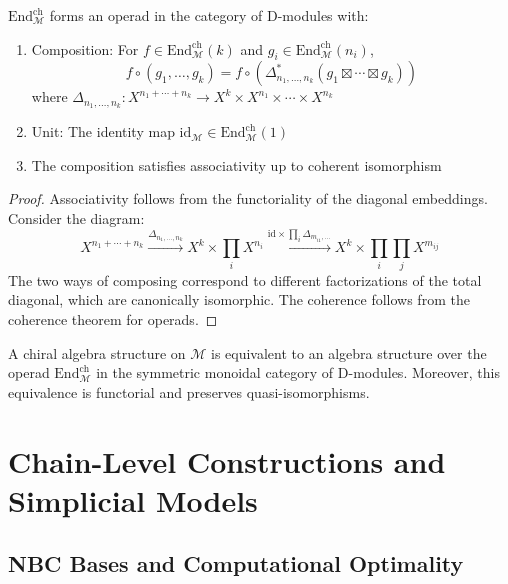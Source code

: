 \begin{proposition}
$\text{End}_{\mathcal{M}}^{\text{ch}}$ forms an operad in the category of D-modules with:
\begin{enumerate}
\item Composition: For $f \in \text{End}_{\mathcal{M}}^{\text{ch}}(k)$ and $g_i \in \text{End}_{\mathcal{M}}^{\text{ch}}(n_i)$,
\[
f \circ (g_1, \ldots, g_k) = f \circ \left(\Delta_{n_1,\ldots,n_k}^* (g_1 \boxtimes \cdots \boxtimes g_k)\right)
\]
where $\Delta_{n_1,\ldots,n_k}: X^{n_1 + \cdots + n_k} \to X^k \times X^{n_1} \times \cdots \times X^{n_k}$
 
\item Unit: The identity map $\text{id}_{\mathcal{M}} \in \text{End}_{\mathcal{M}}^{\text{ch}}(1)$
 
\item The composition satisfies associativity up to coherent isomorphism
\end{enumerate}
\end{proposition}
 
\begin{proof}
Associativity follows from the functoriality of the diagonal embeddings. Consider the diagram:
\[
X^{n_1 + \cdots + n_k} \xrightarrow{\Delta_{n_1,\ldots,n_k}} X^k \times \prod_i X^{n_i} 
\xrightarrow{\text{id} \times \prod_i \Delta_{m_{i1},\ldots}} X^k \times \prod_i \prod_j X^{m_{ij}}
\]
The two ways of composing correspond to different factorizations of the total diagonal, which are 
canonically isomorphic. The coherence follows from the coherence theorem for operads.
\end{proof}
 
\begin{theorem}
A chiral algebra structure on $\mathcal{M}$ is equivalent to an algebra structure over the operad 
$\text{End}_{\mathcal{M}}^{\text{ch}}$ in the symmetric monoidal category of D-modules. Moreover, this 
equivalence is functorial and preserves quasi-isomorphisms.
\end{theorem}


 \section{Chain-Level Constructions and Simplicial Models}
 
\subsection{NBC Bases and Computational Optimality}
 
